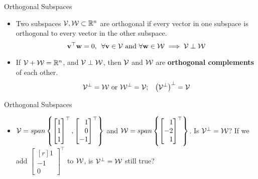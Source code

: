 \documentclass[aspectratio=169]{beamer}
\let\olditem\item
\renewcommand{\item}{\setlength{\itemsep}{\fill}\olditem}
\def\mf{\ensuremath\mathbf}
\def\mb{\ensuremath\mathbb}
\def\mc{\ensuremath\mathcal}
\begin{document}
\begin{frame}[t]{Orthogonal Subspaces}
\begin{itemize}
\item Two subspaces $\mc{V}, \mc{W} \subset \mb{R}^n$ are orthogonal if every vector in one subspace is orthogonal to every vector in the other subspace.
\[ \mf{v}^\top\mf{w} = 0, \,\,\, \forall \mf{v} \in \mc{V} \text{ and } \forall\mf{w} \in \mc{W} \implies \mc{V} \perp \mc{W} \]

\item If $\mc{V} + \mc{W} = \mb{R}^n$, and $\mc{V} \perp \mc{W}$, then $\mc{V}$ and $\mc{W}$ are \textbf{orthogonal complements} of each other.
\[ \mc{V}^{\perp} = \mc{W} \text{ or } \mc{W}^{\perp} = \mc{V}; \,\,\,\,\, \left(\mc{V}^{\perp}\right)^{\perp} = \mc{V} \]
\end{itemize}
\end{frame}


\begin{frame}[t]{Orthogonal Subspaces}
\begin{itemize}
\item {\color{blue} $\mc{V} = span \left\{\begin{bmatrix*}[r]1\\1\\1\end{bmatrix*}^\top, \begin{bmatrix*}[r]1\\0\\-1\end{bmatrix*}^\top\right\}$ and $\mc{W} = span \left\{\begin{bmatrix*}[r]1\\-2\\1\end{bmatrix*}^\top\right\}$. Is $\mc{V}^\perp = \mc{W}$? If we add $\begin{bmatrix*}[r]1\\-1\\0\end{bmatrix*}^\top$ to $\mc{W}$, is $\mc{V}^\perp = \mc{W}$ still true?}
\end{itemize}
\end{frame}
\end{document}
